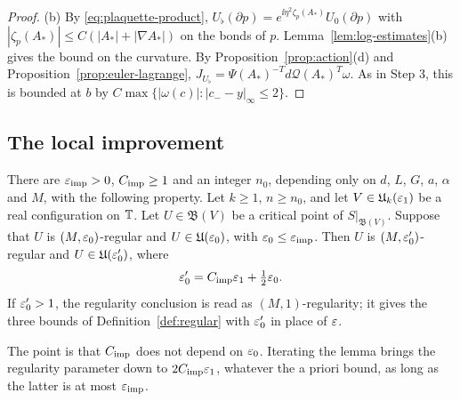 \begin{proof}
(b) By \eqref{eq:plaquette-product}, $U_\flat(\partial p)=e^{\ii\eta^2\zeta_p(A_*)}U_0(\partial p)$ with $|\zeta_p(A_*)|\le C(|A_*|+|\nabla A_*|)$ on the bonds of $p$. Lemma~\ref{lem:log-estimates}(b) gives the bound on the curvature. By Proposition~\ref{prop:action}(d) and Proposition~\ref{prop:euler-lagrange}, $J_{U_\flat}=\Psi(A_*)^{-T}d\mathcal Q(A_*)^T\omega$. As in Step 3, this is bounded at $b$ by $C\max\{|\omega(c)|:|c_--y|_\infty\le2\}$.
\end{proof}

\subsection{The local improvement}

\begin{lemma}\label{lem:improvement}
There are $\varepsilon_{\rm imp}>0$, $C_{\rm imp}\ge1$ and an integer $n_0$, depending only on $d$, $L$, $G$, $a$, $\alpha$ and $M$, with the following property. Let $k\ge1$, $n\ge n_0$, and let $V\in\mathfrak U_k(\varepsilon_1)$ be a real configuration on $\mathbb T$. Let $U\in\mathfrak B(V)$ be a critical point of $S|_{\mathfrak B(V)}$. Suppose that $U$ is $(M,\varepsilon_0)$-regular and $U\in\mathfrak U(\varepsilon_0)$, with $\varepsilon_0\le\varepsilon_{\rm imp}$. Then $U$ is $(M,\varepsilon_0')$-regular and $U\in\mathfrak U(\varepsilon_0')$, where
\[
\varepsilon_0'=C_{\rm imp}\varepsilon_1+\tfrac12\varepsilon_0 .
\]
If $\varepsilon_0'>1$, the regularity conclusion is read as $(M,1)$-regularity; it gives the three bounds of Definition~\ref{def:regular} with $\varepsilon_0'$ in place of $\varepsilon$.
\end{lemma}

The point is that $C_{\rm imp}$ does not depend on $\varepsilon_0$. Iterating the lemma brings the regularity parameter down to $2C_{\rm imp}\varepsilon_1$, whatever the a priori bound, as long as the latter is at most $\varepsilon_{\rm imp}$.

